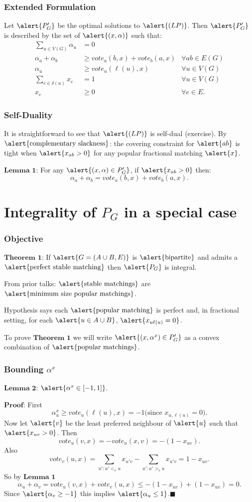 \documentclass[10pt]{beamer}
\begin{document}
\begin{frame}
\frametitle{Extended Formulation}
Let $\alert{P'_G}$ be the optimal solutions to $\alert{(LP)}$. Then $\alert{P'_G}$ is described by the set of $\alert{(x,\alpha)}$ such that:
\begin{align*}
\sum_{u \in V(G)} \alpha_u &= 0 \\
 \alpha_a + \alpha_b &\geq vote_a(b,x) + vote_b(a,x) &\forall ab \in E(G) \\
\alpha_u &\geq vote_u(\ell(u),x) &\forall u \in V(G) \\
\sum_{e \in \delta(u)} x_e &=1 &\forall u \in V(G) \\
x_e &\geq 0 &\forall e \in E.
\end{align*}
\end{frame}

\begin{frame}
\frametitle{Self-Duality}
It is straightforward to see that $\alert{(LP)}$ is self-dual (exercise). By $\text{\alert{complementary slackness}}$: the covering constraint for $\alert{ab}$ is tight when $\alert{x_{ab} > 0}$ for any popular fractional matching $\alert{x}$.

$\textbf{Lemma 1}$: For any $\alert{(x,\alpha) \in P'_G}$, if $\alert{x_{ab} > 0}$ then:
$$\alpha_a + \alpha_b = vote_a(b,x) + vote_b(a,x).$$ 
\end{frame}
\section{Integrality of $P_G$ in a special case}
\begin{frame}
\frametitle{Objective}
$\textbf{Theorem 1:}$ If $\alert{G =(A\cup B, E)}$ is $\text{\alert{bipartite}}$ and admits a $\text{\alert{perfect stable matching}}$ then $\alert{P_G}$ is integral.

From prior talks: $\text{\alert{stable matchings}}$ are $\text{\alert{minimum size popular matchings}}$.

Hypothesis says each $\text{\alert{popular matching}}$ is perfect and, in fractional setting, for each $\alert{u\in A \cup B}$, $\alert{x_{u\ell(u)} = 0}$.

To prove $\textbf{Theorem 1}$ we will write $\alert{(x,\alpha^x) \in P_G'}$ as a convex combination of $\text{\alert{popular matchings}}$.
\end{frame}

\begin{frame}
\frametitle{Bounding $\alpha^x$}
$\textbf{Lemma 2:}$ $\alert{\alpha^x \in [-1,1]}$.

$\textbf{Proof:}$ First
$$\alpha^x_u \geq vote_u(\ell(u), x) = -1 \text{(since }x_{u,\ell(u)} = 0\text{).}$$
Now let $\alert{v}$ be the least preferred neighbour of $\alert{u}$ such that $\alert{x_{uv} >0}$. Then
$$vote_u(v,x) = -vote_u(x,v) = -(1-x_{uv}).$$
Also
$$vote_v(u,x) = \sum_{u':u' <_v u} x_{u'v} - \sum_{u':u' >_v u} x_{u'v} = 1-x_{uv}.$$
So by $\textbf{Lemma 1}$
$$\alpha_u + \alpha_v = vote_u(v,x) + vote_v(u,x) \leq -(1-x_{uv}) + (1-x_{uv}) = 0.$$
Since $\alert{\alpha_v \geq -1}$ this implies $\alert{\alpha_u \leq 1}$.$\blacksquare$
\end{frame}
\end{document}

